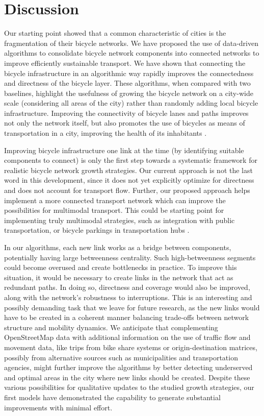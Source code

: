 \section{Discussion}
Our starting point showed that a common characteristic of cities is the fragmentation of their bicycle networks. We have proposed the use of data-driven algorithms to consolidate bicycle network components into connected networks to improve efficiently sustainable transport. We have shown that connecting the bicycle infrastructure in an algorithmic way rapidly improves the connectedness and directness of the bicycle layer. These algorithms, when compared with two baselines, highlight the usefulness of growing the bicycle network on a city-wide scale (considering all areas of the city) rather than randomly adding local bicycle infrastructure. Improving the connectivity of bicycle lanes and paths improves not only the network itself, but also promotes the use of bicycles as means of transportation in a city, improving the health of its inhabitants \cite{Mueller2018Health}.

Improving bicycle infrastructure one link at the time (by identifying suitable components to connect) is only the first step towards a systematic framework for realistic bicycle network growth strategies. Our current approach is not the last word in this development, since it does not yet explicitly optimize for directness and does not account for transport flow. Further, our proposed approach helps implement a more connected transport network which can improve the possibilities for multimodal transport. This could be starting point for implementing truly multimodal strategies, such as integration with public transportation, or bicycle parkings in transportation hubs \cite{Twaddell2018Multimodal}.

In our algorithms, each new link works as a bridge between components, potentially having large betweenness centrality. Such high-betweenness segments could become overused and create bottlenecks in practice. To improve this situation, it would be necessary to create links in the network that act as redundant paths. In doing so, directness and coverage would also be improved, along with the network's robustness to interruptions. This is an interesting and possibly demanding task that we leave for future research, as the new links would have to be created in a coherent manner balancing trade-offs between network structure and mobility dynamics. We anticipate that complementing OpenStreetMap data with additional information on the use of traffic flow and movement data, like trips from bike share systems or origin-destination matrices, possibly from alternative sources such as municipalities and transportation agencies, might further improve the algorithms by better detecting underserved and optimal areas in the city where new links should be created. Despite these various possibilities for qualitative updates to the studied growth strategies, our first models have demonstrated the capability to generate substantial improvements with minimal effort.

